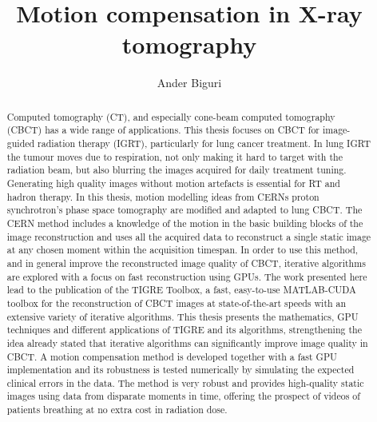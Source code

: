\documentclass[11pt]{report}
\title{Motion compensation in X-ray tomography}
\author{Ander Biguri}
\begin{document}
\maketitle





\tableofcontents
\listoffigures
\listoftables

\begin{abstract}
Computed tomography (CT), and especially cone-beam computed tomography (CBCT) has a wide range of applications. This thesis focuses on CBCT for image-guided radiation therapy (IGRT), particularly for lung cancer treatment. In lung IGRT the tumour moves due to respiration, not only making it hard to target with the radiation beam, but also blurring the images acquired for daily treatment tuning. Generating high quality images without motion artefacts is essential for RT and hadron therapy. In this thesis, motion modelling ideas from CERNs proton synchrotron's phase space tomography are modified and adapted to lung CBCT. The CERN method includes a knowledge of the motion in the basic building blocks of the image reconstruction and uses all the acquired data to reconstruct a single static image at any chosen moment within the acquisition timespan. In order to use this method, and in general improve the reconstructed image quality of CBCT, iterative algorithms are explored with a focus on fast reconstruction using GPUs. The work presented here lead to the publication of the TIGRE Toolbox, a fast, easy-to-use MATLAB-CUDA toolbox for the reconstruction of CBCT images at state-of-the-art speeds with an extensive variety of iterative algorithms. This thesis presents the mathematics, GPU techniques and different applications of TIGRE and its algorithms, strengthening the idea already stated that iterative algorithms can significantly improve image quality in CBCT. A motion compensation method is developed together with a fast GPU implementation and its robustness is tested numerically by simulating the expected clinical errors in the data. The method is very robust and provides high-quality static images using data from disparate moments in time, offering the prospect of videos of patients breathing at no extra cost in radiation dose.

\end{abstract}

\chapterfont{\titlecap}
\sectionfont{\titlecap}
\subsectionfont{\titlecap}
\subsubsectionfont{\titlecap}
\end{document}
